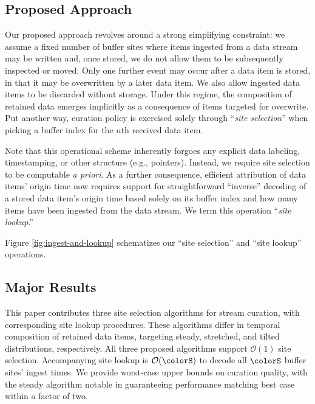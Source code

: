 \subsection{Proposed Approach}


Our proposed approach revolves around a strong simplifying constraint: we assume a fixed number of buffer sites where items ingested from a data stream may be written and, once stored, we do not allow them to be subsequently inspected or moved.
Only one further event may occur after a data item is stored, in that it may be overwritten by a later data item.
We also allow ingested data items to be discarded without storage.
Under this regime, the composition of retained data emerges implicitly as a consequence of items targeted for overwrite.
Put another way, curation policy is exercised solely through ``\textit{site selection}'' when picking a buffer index for the $n$th received data item.

Note that this operational scheme inherently forgoes any explicit data labeling, timestamping, or other structure (e.g., pointers).
Instead, we require site selection to be computable \textit{a priori}.
As a further consequence, efficient attribution of data items' origin time now requires support for straightforward ``inverse'' decoding of a stored data item's origin time based solely on its buffer index and how many items have been ingested from the data stream.
We term this operation ``\textit{site lookup}.''



Figure \ref{fig:ingest-and-lookup} schematizes our ``site selection'' and ``site lookup'' operations.

\subsection{Major Results}

This paper contributes three site selection algorithms for stream curation, with corresponding site lookup procedures.
These algorithms differ in temporal composition of retained data items, targeting steady, stretched, and tilted distributions, respectively.
All three proposed algorithms support $\mathcal{O}(1)$ site selection.
Accompanying site lookup is $\mathcal{O}(\colorS)$ to decode all $\colorS$ buffer sites' ingest times.
We provide worst-case upper bounds on curation quality, with the steady algorithm notable in guaranteeing performance matching best case within a factor of two.
